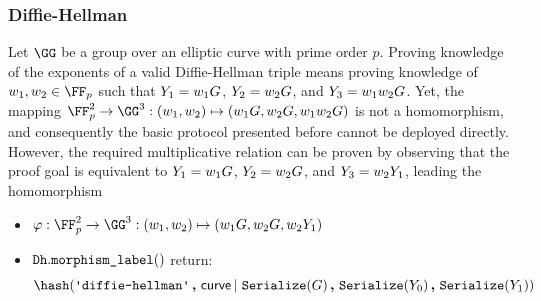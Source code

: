 \documentclass[11pt]{article}
\begin{document}
\subsubsection{Diffie-Hellman}
Let $\GG$ be a group over an elliptic curve with prime order $p$.
Proving knowledge of the exponents of a valid Diffie-Hellman triple means proving knowledge of $\witness_1,\witness_2\in\FF_p$ such that $Y_1=w_1G$, $Y_2=w_2G$, and $Y_3=w_1 w_2 G$.
Yet, the mapping $\FF_p^2\to\GG^3:(\witness_1,\witness_2)\mapsto (\witness_1G,\witness_2G,\witness_1\witness_2G)$ is not a homomorphism, and consequently the basic protocol presented before cannot be deployed directly.
However, the required multiplicative relation can be proven by observing that the proof goal is equivalent to $Y_1=w_1G$, $Y_2=w_2G$, and $Y_3=w_2Y_1$, leading the homomorphism

\begin{itemize}
  \item  $\varphi:\FF_p^2\to\GG^3:(\witness_1,\witness_2)\mapsto(\witness_1G,\witness_2G,\witness_2\statement_1)$
  \item $\texttt{Dh}.\texttt{morphism\_label}()$ return:
  \[
    \hash(\dhlabel \concat \curvectx \concatblock \serialize(G) \concat \serialize(\statement_0) \concat \serialize(\statement_1))
  \]
\end{itemize}
\end{document}
